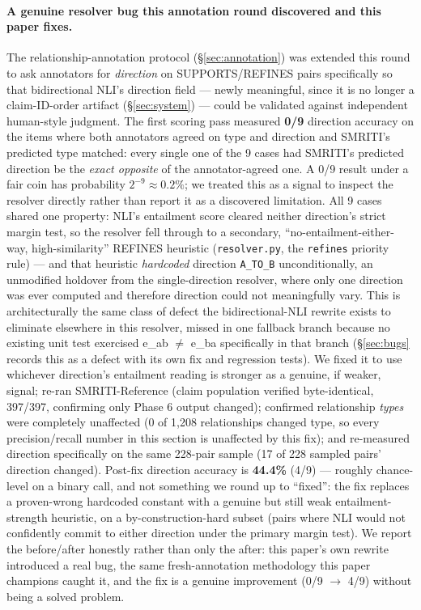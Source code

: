 \paragraph{A genuine resolver bug this annotation round discovered and
this paper fixes.} The relationship-annotation protocol
(\S\ref{sec:annotation}) was extended this round to ask annotators for
\emph{direction} on SUPPORTS/REFINES pairs specifically so that
bidirectional NLI's direction field --- newly meaningful, since it is no
longer a claim-ID-order artifact (\S\ref{sec:system}) --- could be
validated against independent human-style judgment. The first scoring
pass measured \textbf{0/9} direction accuracy on the items where both
annotators agreed on type and direction and SMRITI's predicted type
matched: every single one of the 9 cases had SMRITI's predicted direction
be the \emph{exact opposite} of the annotator-agreed one. A 0/9 result
under a fair coin has probability $2^{-9} \approx 0.2\%$; we treated this
as a signal to inspect the resolver directly rather than report it as a
discovered limitation. All 9 cases shared one property: NLI's entailment
score cleared neither direction's strict margin test, so the resolver
fell through to a secondary, ``no-entailment-either-way, high-similarity''
REFINES heuristic (\texttt{resolver.py}, the \texttt{refines} priority
rule) --- and that heuristic \emph{hardcoded} direction \texttt{A\_TO\_B}
unconditionally, an unmodified holdover from the single-direction
resolver, where only one direction was ever computed and therefore
direction could not meaningfully vary. This is architecturally the same
class of defect the bidirectional-NLI rewrite exists to eliminate
elsewhere in this resolver, missed in one fallback branch because no
existing unit test exercised e\_ab $\neq$ e\_ba specifically in that
branch (\S\ref{sec:bugs} records this as a defect with its own fix and
regression tests). We fixed it to use whichever direction's entailment
reading is stronger as a genuine, if weaker, signal; re-ran
SMRITI-Reference (claim population verified byte-identical, 397/397,
confirming only Phase 6 output changed); confirmed relationship
\emph{types} were completely unaffected (0 of 1{,}208 relationships
changed type, so every precision/recall number in this section is
unaffected by this fix); and re-measured direction specifically on the
same 228-pair sample (17 of 228 sampled pairs' direction changed).
Post-fix direction accuracy is \textbf{44.4\%} (4/9) --- roughly
chance-level on a binary call, and not something we round up to
``fixed'': the fix replaces a proven-wrong hardcoded constant with a
genuine but still weak entailment-strength heuristic, on a
by-construction-hard subset (pairs where NLI would not confidently commit
to either direction under the primary margin test). We report the
before/after honestly rather than only the after: this paper's own
rewrite introduced a real bug, the same fresh-annotation methodology this
paper champions caught it, and the fix is a genuine improvement (0/9
$\to$ 4/9) without being a solved problem.

